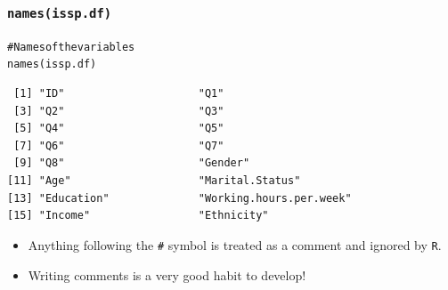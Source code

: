 \documentclass[handout]{beamer}\usepackage[]{graphicx}\usepackage[]{color}
\makeatletter
\newcommand{\hlcom}[1]{\textcolor[rgb]{1,0.533,0}{#1}}%
\newcommand{\hlstd}[1]{\textcolor[rgb]{0,0,0}{#1}}%
\newcommand{\hlkwd}[1]{\textcolor[rgb]{0,0.267,0.4}{#1}}%
\newenvironment{kframe}{%
 \def\at@end@of@kframe{}%
 \ifinner\ifhmode%
  \def\at@end@of@kframe{\end{minipage}}%
  \begin{minipage}{\columnwidth}%
 \fi\fi%
 \def\FrameCommand##1{\hskip\@totalleftmargin \hskip-\fboxsep
 \colorbox{shadecolor}{##1}\hskip-\fboxsep
     \hskip-\linewidth \hskip-\@totalleftmargin \hskip\columnwidth}%
 \MakeFramed {\advance\hsize-\width
   \@totalleftmargin\z@ \linewidth\hsize
   \@setminipage}}%
 {\par\unskip\endMakeFramed%
 \at@end@of@kframe}
\newenvironment{knitrout}{}{} %
\makeatother
\begin{document}
\begin{frame}[fragile]
\frametitle{\texttt{names(issp.df)}}
\begin{knitrout}
\color{fgcolor}\begin{kframe}
\begin{alltt}
\hlcom{#Names of the variables}
\hlkwd{names}\hlstd{(issp.df)}
\end{alltt}
\begin{verbatim}
 [1] "ID"                     "Q1"                    
 [3] "Q2"                     "Q3"                    
 [5] "Q4"                     "Q5"                    
 [7] "Q6"                     "Q7"                    
 [9] "Q8"                     "Gender"                
[11] "Age"                    "Marital.Status"        
[13] "Education"              "Working.hours.per.week"
[15] "Income"                 "Ethnicity"             
\end{verbatim}
\end{kframe}
\end{knitrout}
\begin{itemize}
\item Anything following the \texttt{\#} symbol is treated as a comment and ignored by \texttt{R}.
\item Writing comments is a very good habit to develop!
\end{itemize}
\end{frame}
\end{document}

